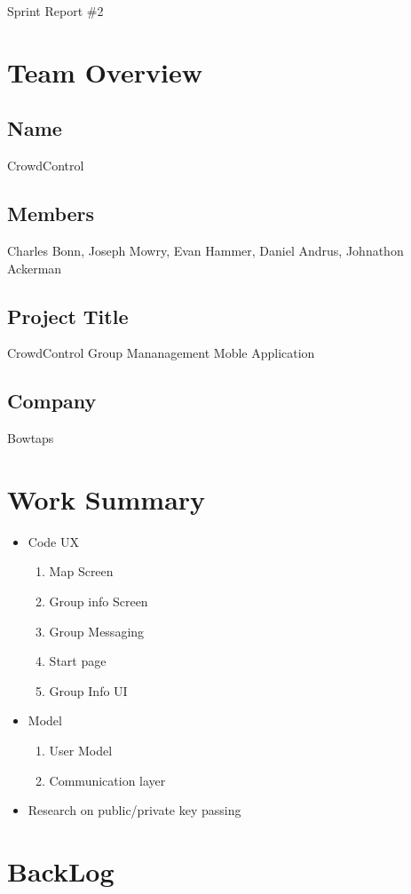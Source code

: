 \documentclass[11pt]{article}
\begin{document}
{\fontsize{16}{16}\selectfont Sprint  Report \#2}

\section*{Team Overview}

\subsection*{Name}
CrowdControl
\subsection*{Members}
Charles Bonn, Joseph Mowry, Evan Hammer, Daniel Andrus, Johnathon Ackerman
\subsection*{Project Title}
CrowdControl Group Mananagement Moble Application
\subsection*{Company}
Bowtaps

\section*{Work Summary}
	\begin{itemize}
	\item Code UX
		\begin{enumerate}
		\item Map Screen
		\item Group info Screen
		\item Group Messaging
		\item Start page
		\item Group Info UI
		\end{enumerate}
	\item Model
		\begin{enumerate}
		\item User Model
		\item Communication layer
		\end{enumerate}
	\item Research on public/private key passing
	\end{itemize}

\section*{BackLog}
\end{document}
